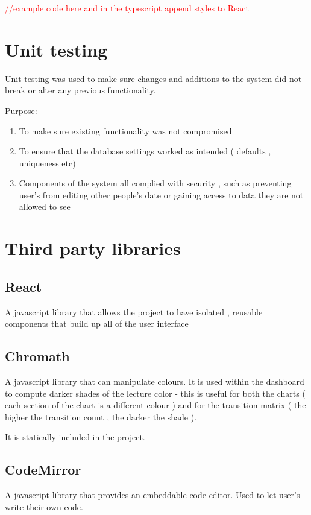 \textcolor{red}{//example code here and in the typescript}
\textcolor{red}{append styles to React}

\section{Unit testing}
Unit testing was used to make sure changes and additions to the system did not break or alter any previous functionality.

Purpose:
\begin{enumerate}
	\item To make sure existing functionality was not compromised
	\item To ensure that the database settings worked as intended ( defaults , uniqueness etc)
	\item Components of the system all complied with security , such as preventing user's from editing other people's date or gaining access to data they are not allowed to see
\end{enumerate}




\section{Third party libraries} \label{libs}

\subsection{React}
A javascript library that allows the project to have isolated , reusable components that build up all of the user interface

\subsection{Chromath} 
A javascript library that can manipulate colours. It is used within the dashboard to compute darker shades of the lecture color - this is useful for both the charts ( each section of the chart is a different colour ) and for the transition matrix ( the higher the transition count , the darker the shade ).

	It is statically included in the project.
	
\subsection{CodeMirror}
A javascript library that provides an embeddable code editor. Used to let user's write their own code.

